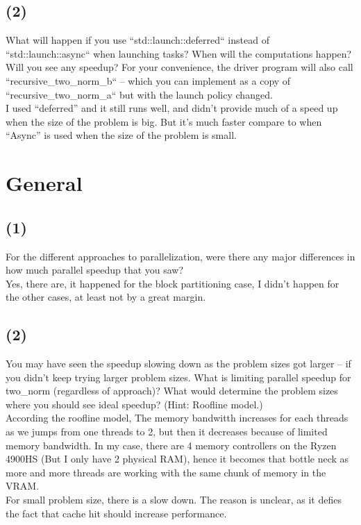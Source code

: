 \documentclass[]{article}
\begin{document}
    \subsection*{(2)}
        What will happen if you use ``std::launch::deferred`` instead of ``std::launch::async`` when launching tasks?  When will the computations happen?  Will you see any speedup?  For your convenience, the driver program will also call ``recursive\_two\_norm\_b`` -- which you can implement as a copy of ``recursive\_two\_norm\_a`` but with the launch policy changed.
        \\[1.1em]
        I used ``deferred'' and it still runs well, and didn't provide much of a speed up when the size of the problem is big. But it's much faster compare to when ``Async'' is used when the size of the problem is small. 


\section*{General}
    
    \subsection*{(1)}
        For the different approaches to parallelization, were there any major differences in how much parallel speedup that you saw?
        \\
        Yes, there are, it happened for the block partitioning case, I didn't happen for the other cases, at least not by a great margin. 

    \subsection*{(2)}
        You may have seen the speedup slowing down as the problem sizes got larger -- if you didn't keep trying larger problem sizes.  What is limiting parallel speedup for two\_norm (regardless of approach)?  What would determine the 
        problem sizes where you should see ideal speedup?  (Hint: Roofline model.)
        \\
        According the roofline model, The memory bandwitth increases for each threads  as we jumps from one threads to 2, but then it decreases because of limited memory bandwidth. In my case, there are 4 memory controllers on the Ryzen 4900HS (But I only have 2 physical RAM), hence it becomes that bottle neck as more and more threads are working with the same chunk of memory in the VRAM. 
        \\
        For small problem size, there is a slow down. The reason is unclear, as it defies the fact that cache hit should increase performance.
\end{document}
